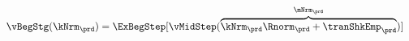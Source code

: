   \begin{equation}\begin{gathered}\begin{aligned}
        \vBegStg(\kNrm_{\prd}) & = \ExBegStep[\vMidStep(\overbrace{\kNrm_{\prd} \Rnorm_{\prd} + \tranShkEmp_{\prd}}^{\mNrm_{\prd}})]  \label{eq:vBegStg}
      \end{aligned}\end{gathered}\end{equation}
